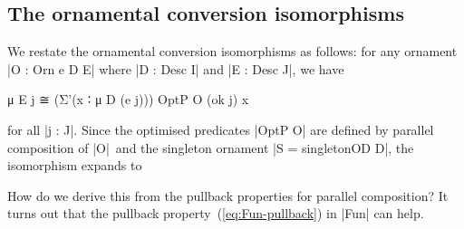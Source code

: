 \subsection{The ornamental conversion isomorphisms}
\label{sec:ornamental-conversion-isomorphisms}

We restate the ornamental conversion isomorphisms as follows: for any ornament |O : Orn e D E| where |D : Desc I| and |E : Desc J|, we have
\begin{code}
μ E j ≅ (Σ'(x ∶ μ D (e j))) OptP O (ok j) x
\end{code}
for all |j : J|.
Since the optimised predicates |OptP O| are defined by parallel composition of |O|~and the singleton ornament |S = singletonOD D|, the isomorphism expands to
How do we derive this from the pullback properties for parallel composition?
It turns out that the pullback property~(\ref{eq:Fun-pullback}) in |Fun| can help.

